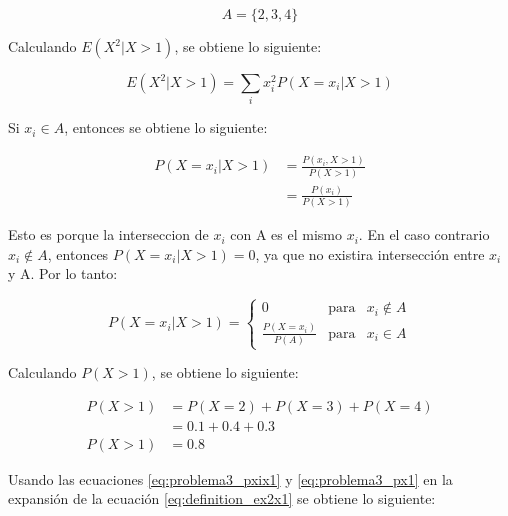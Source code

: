 \begin{equation*}
    A = \{2,3,4 \}
\end{equation*}

Calculando $E(X^2|X>1)$, se obtiene lo siguiente:

\begin{equation}
    E(X^2|X>1) = \sum_i x_i^2 P(X=x_i | X >1 )
    \label{eq:definition_ex2x1}
\end{equation}

Si $x_i \in A$, entonces se obtiene lo siguiente:

\begin{align*}
    P(X=x_i | X>1) & = \frac{P(x_i,X>1)}{P(X>1)} \\
                   & = \frac{P(x_i)}{P(X>1)}
\end{align*}

Esto es porque la interseccion de $x_i$ con A es el mismo $x_i$. En el caso contrario $x_i \notin A$, entonces $P(X=x_i | X>1) =0$, ya que no existira intersección entre $x_i$ y A. Por lo tanto:

\begin{equation}
    P(X=x_i | X>1) = \left\lbrace \begin{matrix}
        0                     & \text{para} & x_i\notin A \\
        \frac{P(X=x_i)}{P(A)} & \text{para} & x_i\in A
    \end{matrix} \right. \label{eq:problema3_pxix1}
\end{equation}

Calculando $P(X>1)$, se obtiene lo siguiente:

\begin{align}
    P(X>1) & = P(X=2) + P(X=3) + P(X=4) \nonumber \\
           & = 0.1+0.4+0.3\nonumber               \\
    P(X>1) & = 0.8 \label{eq:problema3_px1}
\end{align}

Usando las ecuaciones \ref{eq:problema3_pxix1} y \ref{eq:problema3_px1} en la expansión de la ecuación \ref{eq:definition_ex2x1} se obtiene lo siguiente:

